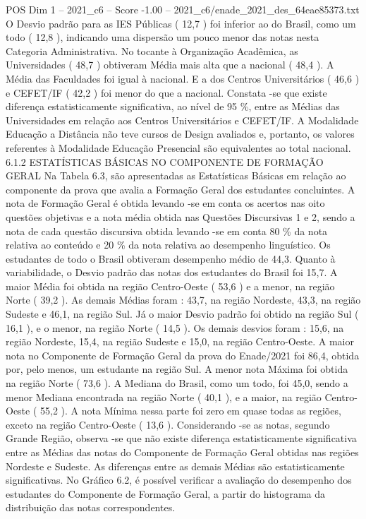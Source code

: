 \begin{textsample}{POS Dim 1 – 2021\_c6 – Score -1.00 – 2021\_c6/enade\_2021\_des\_64eae85373.txt}
O Desvio padrão para as IES Públicas ( 12,7 ) foi inferior ao do Brasil, como um todo ( 12,8 ), indicando uma dispersão um pouco menor das notas nesta Categoria Administrativa.
No tocante à Organização Acadêmica, as Universidades ( 48,7 ) obtiveram Média mais alta que a nacional ( 48,4 ).
A Média das Faculdades foi igual à nacional.
E a dos Centros Universitários ( 46,6 ) e CEFET/IF ( 42,2 ) foi menor do que a nacional.
Constata -se que existe diferença estatisticamente significativa, ao nível de 95 \%, entre as Médias das Universidades em relação aos Centros Universitários e CEFET/IF.
A Modalidade Educação a Distância não teve cursos de Design avaliados e, portanto, os valores referentes à Modalidade Educação Presencial são equivalentes ao total nacional. 6.1.2 ESTATÍSTICAS BÁSICAS NO COMPONENTE DE FORMAÇÃO GERAL Na Tabela 6.3, são apresentadas as Estatísticas Básicas em relação ao componente da prova que avalia a Formação Geral dos estudantes concluintes.
A nota de Formação Geral é obtida levando -se em conta os acertos nas oito questões objetivas e a nota média obtida nas Questões Discursivas 1 e 2, sendo a nota de cada questão discursiva obtida levando -se em conta 80 \% da nota relativa ao conteúdo e 20 \% da nota relativa ao desempenho linguístico.
Os estudantes de todo o Brasil obtiveram desempenho médio de 44,3.
Quanto à variabilidade, o Desvio padrão das notas dos estudantes do Brasil foi 15,7.
A maior Média foi obtida na região Centro-Oeste ( 53,6 ) e a menor, na região Norte ( 39,2 ).
As demais Médias foram : 43,7, na região Nordeste, 43,3, na região Sudeste e 46,1, na região Sul.
Já o maior Desvio padrão foi obtido na região Sul ( 16,1 ), e o menor, na região Norte ( 14,5 ).
Os demais desvios foram : 15,6, na região Nordeste, 15,4, na região Sudeste e 15,0, na região Centro-Oeste.
A maior nota no Componente de Formação Geral da prova do Enade/2021 foi 86,4, obtida por, pelo menos, um estudante na região Sul.
A menor nota Máxima foi obtida na região Norte ( 73,6 ).
A Mediana do Brasil, como um todo, foi 45,0, sendo a menor Mediana encontrada na região Norte ( 40,1 ), e a maior, na região Centro-Oeste ( 55,2 ).
A nota Mínima nessa parte foi zero em quase todas as regiões, exceto na região Centro-Oeste ( 13,6 ).
Considerando -se as notas, segundo Grande Região, observa -se que não existe diferença estatisticamente significativa entre as Médias das notas do Componente de Formação Geral obtidas nas regiões Nordeste e Sudeste.
As diferenças entre as demais Médias são estatisticamente significativas.
No Gráfico 6.2, é possível verificar a avaliação do desempenho dos estudantes do Componente de Formação Geral, a partir do histograma da distribuição das notas correspondentes.

\end{textsample}
